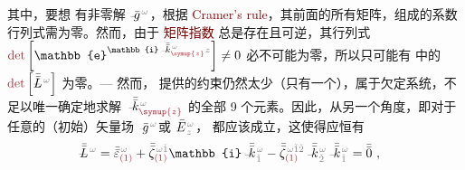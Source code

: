 其中，要想  有非零解 $\Xint{{}^{}_{\mathcolor{gray}{-}}}{10}{\bar{g}}^{\;\!\mathcolor{gray}{\omega}}$，根据 \textcolor{Maroon}{Cramer's rule}，其前面的所有矩阵，组成的系数行列式需为零。然而，由于 \textcolor{Maroon}{矩阵指数} 总是存在且可逆，其行列式 $\textcolor{Maroon}{\det} \left[ \mathbb{e}^{\mathbb{i} \Xint{\begin{smallmatrix} ~ \\ {}^{}_{\mathcolor{gray}{-}} \\ ~ \end{smallmatrix}}{15}{\bar{\bar{k}}}_{\textcolor{Maroon}{\symup{z}}}^{\;\! \mathcolor{gray}{\omega}} \mathcolor{gray}{z}} \right] \neq 0$ 必不可能为零，所以只可能有  中的 $\textcolor{Maroon}{\det} \left[ \Xint{\mathcolor{gray}{-}}{32}{\bar{\bar{L}}}^{\;\! \mathcolor{gray}{\omega}} \right]$ 为零。--- 然而， 提供的约束仍然太少（只有一个），属于欠定系统，不足以唯一确定地求解 $\Xint{\begin{smallmatrix} ~ \\ {}^{}_{\mathcolor{gray}{-}} \\ ~ \end{smallmatrix}}{15}{\bar{\bar{k}}}_{\textcolor{Maroon}{\symup{z}}}^{\;\! \mathcolor{gray}{\omega}}$ 的全部 9 个元素。因此，从另一个角度，即对于任意的（初始）矢量场 $\Xint{{}^{}_{\mathcolor{gray}{-}}}{10}{\bar{g}}^{\;\!\mathcolor{gray}{\omega}}$或 $\Xint{\mathcolor{gray}{-}}{295}{\bar{E}}^{\;\!\mathcolor{gray}{\omega}}_{\;\! \mathcolor{gray}{z}}$， 都应该成立\cite{sturmElectromagneticWavesCrystals2024}，这使得应恒有
\begin{align} \label{eq:nonlinear(2)-wave_wkrho-simplify6-L4}
	\Xint{\mathcolor{gray}{-}}{32}{\bar{\bar{L}}}^{\;\! \mathcolor{gray}{\omega}}
	= \bar{\bar{\varepsilon}}^{\;\! \mathcolor{gray}{\omega}}_{\textcolor{Maroon}{(1)}} + \bar{\bar{\zeta}}^{\;\! \mathcolor{gray}{\omega} \mathcolor{gray}{\check{1}}}_{\textcolor{Maroon}{(1)}} \mathbb{i} \Xint{\begin{smallmatrix} ~ \\ {}^{}_{\mathcolor{gray}{-}} \\ ~ \end{smallmatrix}}{15}{\bar{\bar{k}}}_{\;\! \mathcolor{gray}{\check{1}}}^{\;\! \mathcolor{gray}{\omega}} - \bar{\bar{\zeta}}^{\;\! \mathcolor{gray}{\omega} \mathcolor{gray}{\check{1} \check{2}}}_{\textcolor{Maroon}{(1)}} \Xint{\begin{smallmatrix} ~ \\ {}^{}_{\mathcolor{gray}{-}} \\ ~ \end{smallmatrix}}{15}{\bar{\bar{k}}}_{\;\! \mathcolor{gray}{\check{2}}}^{\;\! \mathcolor{gray}{\omega}} \Xint{\begin{smallmatrix} ~ \\ {}^{}_{\mathcolor{gray}{-}} \\ ~ \end{smallmatrix}}{15}{\bar{\bar{k}}}_{\;\! \mathcolor{gray}{\check{1}}}^{\;\! \mathcolor{gray}{\omega}} &= \bar{\bar{0}}~,
\end{align}

